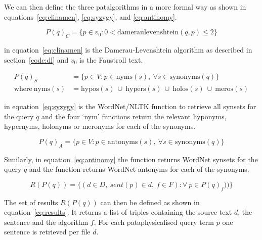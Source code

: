 We can then define the three patalgorithms in a more formal way as shown in equations~\ref{eq:clinamen}, \ref{eq:syzygy}, and \ref{eq:antinomy}.

\begin{equation}
  P(q)_C = \{p \in v_0: 0 < \text{dameraulevenshtein}(q,p) \leq 2\}
  \label{eq:clinamen}
\end{equation}

 in equation~\ref{eq:clinamen}\marginpar{$\bm{\Sigma}$~\ref{eq:clinamen}} is the Damerau-Levenshtein algorithm as described in section~\ref{code:dl} and $v_0$ is the Faustroll text.

\begin{equation}
  \begin{split}
    P(q)_S &= \{p \in V: p \in \text{nyms}(s), \ \forall s \in \text{synonyms}(q)\}\\
    \text{where} \ \text{nyms}(s) &= \text{hypos}(s) \ \cup \ \text{hypers}(s) \ \cup \ \text{holos}(s) \ \cup \ \text{meros}(s)
  \end{split}
  \label{eq:syzygy}
\end{equation}

 in equation~\ref{eq:syzygy}\marginpar{$\bm{\Sigma}$~\ref{eq:syzygy}} is the WordNet/\ac{NLTK} function to retrieve all synsets for the query $q$ and the four `nym' functions return the relevant hyponyms, hypernyms, holonyms or meronyms for each of the synonyms.

\begin{equation}
  P(q)_A = \{p \in V: p \in \text{antonyms}(s), \ \forall s \in \text{synonyms}(q)\}
  \label{eq:antinomy}
\end{equation}

Similarly, in equation~\ref{eq:antinomy}\marginpar{$\bm{\Sigma}$~\ref{eq:antinomy}} the  function returns WordNet synsets for the query $q$ and the  function returns WordNet antonyms for each of the synonyms.

\begin{equation}
  R(P(q)) = \{(d \in D, \ sent(p) \in d, \ f \in F): \forall \ p \in P(q)_f)) \}
  \label{eq:results}
\end{equation}

The set of results $R(P(q))$ can then be defined as shown in equation~\ref{eq:results}\marginpar{$\bm{\Sigma}$~\ref{eq:results}}. It returns a list of triples containing the source text $d$, the sentence  and the algorithm $f$. For each pataphysicalised query term $p$ one sentence is retrieved per file $d$.


